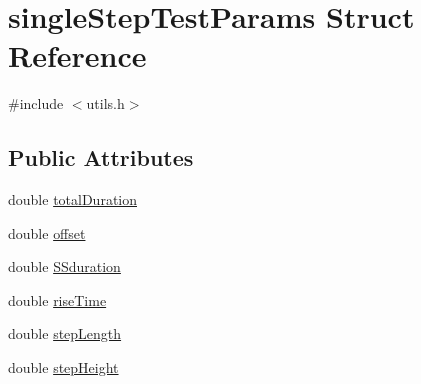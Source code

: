 \hypertarget{structsingleStepTestParams}{\section{single\-Step\-Test\-Params \-Struct \-Reference}
\label{structsingleStepTestParams}
}


{\ttfamily \#include $<$utils.\-h$>$}

\subsection*{\-Public \-Attributes}
\begin{DoxyCompactItemize}
\item 
double \hyperlink{structsingleStepTestParams_a64dfd6827254af3491d5ef777a365106}{total\-Duration}
\item 
double \hyperlink{structsingleStepTestParams_a48f06adc433c0802b26a393afa66624e}{offset}
\item 
double \hyperlink{structsingleStepTestParams_a4e63c961cc10a9191f634ea6f7d9d34c}{\-S\-Sduration}
\item 
double \hyperlink{structsingleStepTestParams_ac57481df42dfcc5b6414bba37a6872e7}{rise\-Time}
\item 
double \hyperlink{structsingleStepTestParams_a17bf92e96d709f6cead23bcdcda88d17}{step\-Length}
\item 
double \hyperlink{structsingleStepTestParams_a1b6267edaee10af0a7162065d0ba7a20}{step\-Height}
\end{DoxyCompactItemize}


